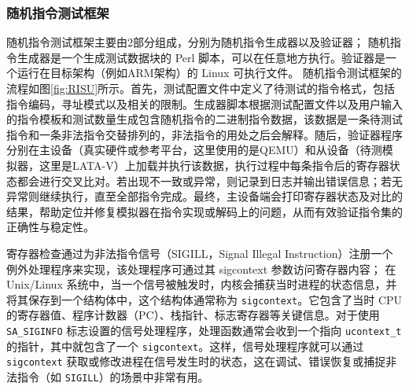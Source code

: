 \subsubsection{随机指令测试框架}
随机指令测试框架主要由2部分组成，分别为随机指令生成器以及验证器；
随机指令生成器是一个生成测试数据块的 Perl 脚本，可以在任意地方执行。验证器是一个运行在目标架构（例如ARM架构）的 Linux 可执行文件。
随机指令测试框架的流程如图\ref{fig:RISU}所示。首先，测试配置文件中定义了待测试的指令格式，包括指令编码，寻址模式以及相关的限制。生成器脚本根据测试配置文件以及用户输入的指令模板和测试数量生成包含随机指令的二进制指令数据，该数据是一条待测试指令和一条非法指令交替排列的，非法指令的用处之后会解释。随后，验证器程序分别在主设备（真实硬件或参考平台，这里使用的是QEMU）和从设备（待测模拟器，这里是LATA-V）上加载并执行该数据，执行过程中每条指令后的寄存器状态都会进行交叉比对。若出现不一致或异常，则记录到日志并输出错误信息；若无异常则继续执行，直至全部指令完成。最终，主设备端会打印寄存器状态及对比的结果，帮助定位并修复模拟器在指令实现或解码上的问题，从而有效验证指令集的正确性与稳定性。

寄存器检查通过为非法指令信号（SIGILL，Signal Illegal Instruction）注册一个例外处理程序来实现，该处理程序可通过其 sigcontext 参数访问寄存器内容；
在 Unix/Linux 系统中，当一个信号被触发时，内核会捕获当时进程的状态信息，并将其保存到一个结构体中，这个结构体通常称为 \texttt{sigcontext}。它包含了当时 CPU 的寄存器值、程序计数器（PC）、栈指针、标志寄存器等关键信息。对于使用 \texttt{SA\_SIGINFO} 标志设置的信号处理程序，处理函数通常会收到一个指向 \texttt{ucontext\_t} 的指针，其中就包含了一个 \texttt{sigcontext}。这样，信号处理程序就可以通过 \texttt{sigcontext} 获取或修改进程在信号发生时的状态，这在调试、错误恢复或捕捉非法指令（如 \texttt{SIGILL}）的场景中非常有用。




